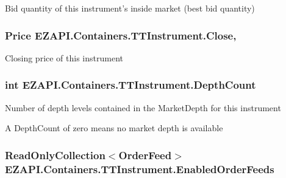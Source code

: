 Bid quantity of this instrument's inside market (best bid quantity) 

\hypertarget{class_e_z_a_p_i_1_1_containers_1_1_t_t_instrument_acabb0a759b2015272ed8e8c33364aba0}{
\subsubsection[{Close}]{\setlength{\rightskip}{0pt plus 5cm}Price E\-Z\-A\-P\-I.\-Containers.\-T\-T\-Instrument.\-Close\hspace{0.3cm}{\ttfamily [get]}, {\ttfamily [set]}}}\label{class_e_z_a_p_i_1_1_containers_1_1_t_t_instrument_acabb0a759b2015272ed8e8c33364aba0}


Closing price of this instrument 

\hypertarget{class_e_z_a_p_i_1_1_containers_1_1_t_t_instrument_a50cdd8a27c71bb4fdaefe7741c3c0279}{
\subsubsection[{Depth\-Count}]{\setlength{\rightskip}{0pt plus 5cm}int E\-Z\-A\-P\-I.\-Containers.\-T\-T\-Instrument.\-Depth\-Count\hspace{0.3cm}{\ttfamily [get]}}}\label{class_e_z_a_p_i_1_1_containers_1_1_t_t_instrument_a50cdd8a27c71bb4fdaefe7741c3c0279}


Number of depth levels contained in the Market\-Depth for this instrument 

A Depth\-Count of zero means no market depth is available\hypertarget{class_e_z_a_p_i_1_1_containers_1_1_t_t_instrument_a70e0fc1c7ca400db941b75677a10b23f}{
\subsubsection[{Enabled\-Order\-Feeds}]{\setlength{\rightskip}{0pt plus 5cm}Read\-Only\-Collection$<$Order\-Feed$>$ E\-Z\-A\-P\-I.\-Containers.\-T\-T\-Instrument.\-Enabled\-Order\-Feeds\hspace{0.3cm}{\ttfamily [get]}}}\label{class_e_z_a_p_i_1_1_containers_1_1_t_t_instrument_a70e0fc1c7ca400db941b75677a10b23f}


